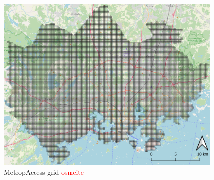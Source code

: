 \begin{figure}[H]%
    \includegraphics[width=\textwidth]{images/thesis_data_grid.png}
    \caption[MetropAccess grid]{MetropAccess grid \textcolor{red}{osmcite}}%
    \label{fig:datalayers_metropaccess_ykr}%
\end{figure}

